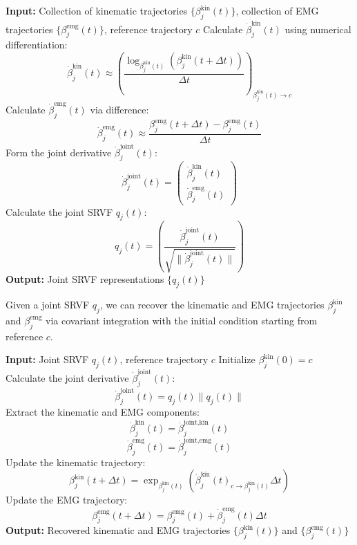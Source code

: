 \documentclass{article}
\begin{document}
\begin{algorithm}
\caption{Covariant Derivative and Transported Joint SRVF Calculation}
\begin{algorithmic}[1]
\STATE \textbf{Input:} Collection of kinematic trajectories $\{\beta_j^{\text{kin}}(t)\}$, collection of EMG trajectories $\{\beta_j^{\text{emg}}(t)\}$, reference trajectory $c$
    \STATE Calculate $\dot{\beta}_j^{\text{kin}}(t)$ using numerical differentiation:
    \[
    \dot{\beta}_j^{\text{kin}}(t) \approx \left( \frac{\log_{\beta_j^{\text{kin}}(t)}(\beta_j^{\text{kin}}(t+\Delta t))}{\Delta t}\right)_{\beta_j^{\text{kin}}(t) \rightarrow c}
    \]
    \STATE Calculate $\dot{\beta}_j^{\text{emg}}(t)$ via difference:
    \[
    \dot{\beta}_j^{\text{emg}}(t) \approx \frac{\beta_j^{\text{emg}}(t+\Delta t) - \beta_j^{\text{emg}}(t)}{\Delta t}
    \]
    \STATE Form the joint derivative $\dot{\beta}_j^{\text{joint}}(t)$:
    \[
    \dot{\beta}_j^{\text{joint}}(t) = \begin{pmatrix}
    \dot{\beta}_j^{\text{kin}}(t) \\
    \dot{\beta}_j^{\text{emg}}(t)
    \end{pmatrix}
    \]
    \STATE Calculate the joint SRVF $q_j(t)$:
    \[
    q_j(t) = \left(\frac{\dot{\beta}_j^{\text{joint}}(t)}{\sqrt{\lVert \dot{\beta}_j^{\text{joint}}(t) \rVert}}\right)
    \]
\ENDFOR
\STATE \textbf{Output:} Joint SRVF representations $\{q_j(t)\}$
\end{algorithmic}
\end{algorithm}

Given a joint SRVF $q_j$, we can recover the kinematic and EMG trajectories $\beta_j^{\text{kin}}$ and $\beta_j^{\text{emg}}$ via covariant integration with the initial condition starting from reference $c$.

\begin{algorithm}
\caption{Trajectory Recovery}
\begin{algorithmic}[1]
\STATE \textbf{Input:} Joint SRVF $q_j(t)$, reference trajectory $c$
\STATE Initialize $\beta_j^{\text{kin}}(0) = c$
    \STATE Calculate the joint derivative $\dot{\beta}_j^{\text{joint}}(t)$:
    \[
    \dot{\beta}_j^{\text{joint}}(t) = q_j(t) \lVert q_j(t) \rVert
    \]
    \STATE Extract the kinematic and EMG components:
    \[
    \dot{\beta}_j^{\text{kin}}(t) = \dot{\beta}_j^{\text{joint}, \text{kin}}(t)
    \]
    \[
    \dot{\beta}_j^{\text{emg}}(t) = \dot{\beta}_j^{\text{joint}, \text{emg}}(t)
    \]
    \STATE Update the kinematic trajectory:
    \[
    \beta_j^{\text{kin}}(t+\Delta t) = \exp_{\beta_j^{\text{kin}}(t)} \left( \dot{\beta}_j^{\text{kin}}(t)_{c \rightarrow \beta_j^{\text{kin}}(t)} \Delta t \right)
    \]
    \STATE Update the EMG trajectory:
    \[
    \beta_j^{\text{emg}}(t+\Delta t) = \beta_j^{\text{emg}}(t) + \dot{\beta}_j^{\text{emg}}(t) \Delta t
    \]
\ENDFOR
\STATE \textbf{Output:} Recovered kinematic and EMG trajectories $\{\beta_j^{\text{kin}}(t)\}$ and $\{\beta_j^{\text{emg}}(t)\}$
\end{algorithmic}
\end{algorithm}
\end{document}
